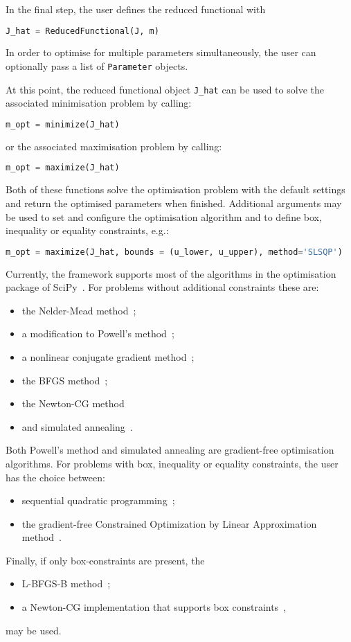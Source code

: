 \documentclass[prodmode,acmtoms]{acmsmall}
\begin{document}
In the final step, the user defines the reduced functional  with
\begin{lstlisting}[language=Python,numbers=none]
      J_hat = ReducedFunctional(J, m)
\end{lstlisting}
In order to optimise for multiple parameters simultaneously, the user can optionally pass a list of \texttt{Parameter} objects.

At this point, the reduced functional object \texttt{J\_hat} can be used to solve the associated minimisation problem  by calling:
\begin{lstlisting}[language=Python,numbers=none]
      m_opt = minimize(J_hat)
\end{lstlisting}
or the associated maximisation problem  by calling:
\begin{lstlisting}[language=Python,numbers=none]
      m_opt = maximize(J_hat)
\end{lstlisting}
Both of these functions solve the optimisation problem with the default settings and return the optimised parameters when finished. 
Additional arguments may be used to set and configure the optimisation algorithm and to define box, inequality or equality constraints, e.g.: 
\begin{lstlisting}[language=Python,numbers=none]
m_opt = maximize(J_hat, bounds = (u_lower, u_upper), method='SLSQP')
\end{lstlisting}

Currently, the framework supports most of the algorithms in the optimisation package of SciPy~\cite{scipy}.
For problems without additional constraints these are: 
\begin{itemize}
\item the Nelder-Mead method~\cite{nelder1965};
\item a modification to Powell's method~\cite{powell1964};
\item a nonlinear conjugate gradient method~\cite[\S 5.2]{wright2006};
\item the BFGS method~\cite[\S 6.1]{wright2006}; 
\item the Newton-CG method~\cite[\S 7.1]{wright2006} 
\item and simulated annealing~\cite{laarhoven1987}.
\end{itemize}
Both Powell's method and simulated annealing are gradient-free optimisation algorithms. 
For problems with box, inequality or equality constraints, the user has the choice between:
\begin{itemize}
 \item sequential quadratic programming~\cite{kraft1994};
\item the gradient-free Constrained Optimization by Linear Approximation method~\cite{powell1994}.
\end{itemize}
Finally, if only box-constraints are present, the 
\begin{itemize}
 \item L-BFGS-B method~\cite[\S 7.2]{wright2006};
 \item a Newton-CG implementation that supports box constraints~\cite{nash1984},
\end{itemize}
 may be used. 
 
\end{document}
